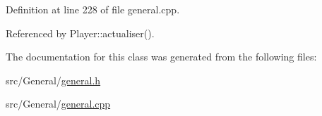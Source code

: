 Definition at line 228 of file general.\-cpp.



Referenced by Player\-::actualiser().



The documentation for this class was generated from the following files\-:\begin{DoxyCompactItemize}
\item 
src/\-General/\hyperlink{general_8h}{general.\-h}\item 
src/\-General/\hyperlink{general_8cpp}{general.\-cpp}\end{DoxyCompactItemize}
